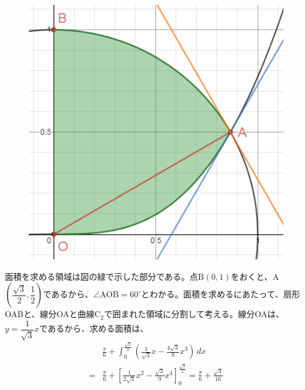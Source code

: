 \begin{figure}
 \includegraphics[width=\linewidth]{../problems/Q_193/A_193.png}
\end{figure}
面積を求める領域は図の緑で示した部分である。点B$(0,1)$をおくと、A$\left(\dfrac{\sqrt{3}}{2}, \dfrac{1}{2}\right)$であるから、$\angle\mathrm{AOB}=60^\circ$とわかる。面積を求めるにあたって、扇形OABと、線分OAと曲線C$_2$で囲まれた領域に分割して考える。線分OAは、$y=\dfrac{1}{\sqrt{3}}x$であるから、求める面積は、
\begin{align*}
 &\frac{\pi}{6}+\int^{\frac{\sqrt{3}}{2}}_0\! \left(\frac{1}{\sqrt{3}}x-\frac{4\sqrt{3}}{9}x^3 \right) \,dx \\
 =& \frac{\pi}{6}+\left[\frac{1}{2\sqrt{3}}x^2-\frac{\sqrt{3}}{9}x^4\right]^{\frac{\sqrt{3}}{2}}_0=\frac{\pi}{6}+\frac{\sqrt{3}}{16}
\end{align*}